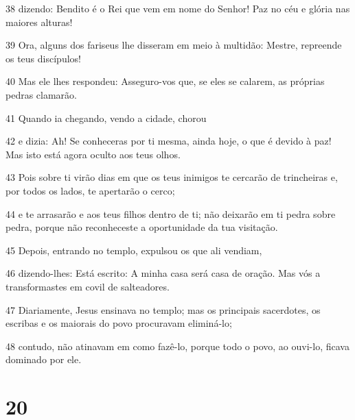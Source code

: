 \par 38 dizendo: Bendito é o Rei que vem em nome do Senhor! Paz no céu e glória nas maiores alturas!
\par 39 Ora, alguns dos fariseus lhe disseram em meio à multidão: Mestre, repreende os teus discípulos!
\par 40 Mas ele lhes respondeu: Asseguro-vos que, se eles se calarem, as próprias pedras clamarão.
\par 41 Quando ia chegando, vendo a cidade, chorou
\par 42 e dizia: Ah! Se conheceras por ti mesma, ainda hoje, o que é devido à paz! Mas isto está agora oculto aos teus olhos.
\par 43 Pois sobre ti virão dias em que os teus inimigos te cercarão de trincheiras e, por todos os lados, te apertarão o cerco;
\par 44 e te arrasarão e aos teus filhos dentro de ti; não deixarão em ti pedra sobre pedra, porque não reconheceste a oportunidade da tua visitação.
\par 45 Depois, entrando no templo, expulsou os que ali vendiam,
\par 46 dizendo-lhes: Está escrito: A minha casa será casa de oração. Mas vós a transformastes em covil de salteadores.
\par 47 Diariamente, Jesus ensinava no templo; mas os principais sacerdotes, os escribas e os maiorais do povo procuravam eliminá-lo;
\par 48 contudo, não atinavam em como fazê-lo, porque todo o povo, ao ouvi-lo, ficava dominado por ele.

\chapter{20}

